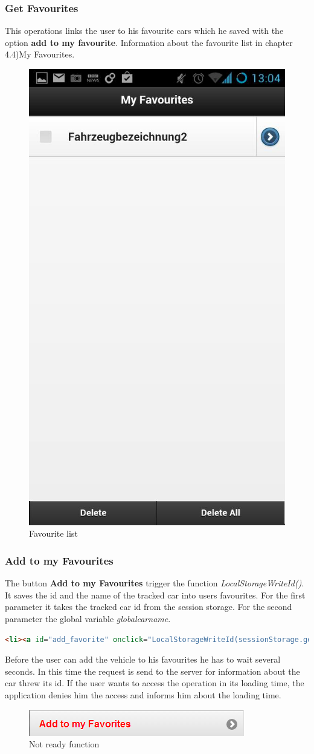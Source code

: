 \subsubsection{Get Favourites}
This operations links the user to his favourite cars which he saved with the option \textbf{add to my favourite}. Information about the favourite list in chapter 4.4)My Favourites.
\\
\begin{figure}[h]
\centering
\includegraphics[width=0.
\linewidth]{graphics/chapter4/10}
\caption{Favourite list}
\label{fig:11}
\end{figure}
\newpage

\subsubsection{Add to my Favourites}
The button \textbf{Add to my Favourites} trigger the function \textit{LocalStorageWriteId()}. It saves the id and the name of the tracked car into users favourites. For the first parameter it takes the tracked car id from the session storage. For the second parameter the global variable \textit{globalcarname}.
\\

\begin{lstlisting}[language=html, caption= 
add favourite sorce code,captionpos=b]
<li><a id="add_favorite" onclick="LocalStorageWriteId(sessionStorage.getItem('id'),globalcarname);" style="color:red" rel="external" >Add to my Favorites</a></li>
\end{lstlisting}

Before the user can add the vehicle to his favourites he has to wait several seconds. In this time the request is send to the server for information about the car threw its id. If the user wants to access the operation in its loading time, the application denies him the access and informs him about the loading time.
\\

\begin{figure}[h]
\centering
\includegraphics[width=0.6\linewidth]{graphics/chapter4/11}
\caption{Not ready function}
\label{fig:12}
\end{figure}

